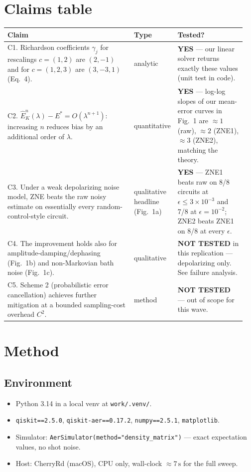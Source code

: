 \documentclass[11pt]{article}
\begin{document}
\section{Claims table}
\begin{longtable}{p{0.55\linewidth} p{0.10\linewidth} p{0.30\linewidth}}
\toprule
\textbf{Claim} & \textbf{Type} & \textbf{Tested?}\\
\midrule
C1. Richardson coefficients $\gamma_j$ for rescalings $c=(1,2)$ are $(2,-1)$ and for $c=(1,2,3)$ are $(3,-3,1)$ (Eq.~4). & analytic & \textbf{YES} --- our linear solver returns exactly these values (unit test in code).\\
C2. $\hat{E}^n_K(\lambda) - E^* = O(\lambda^{n+1})$: increasing $n$ reduces bias by an additional order of $\lambda$. & quantitative & \textbf{YES} --- log-log slopes of our mean-error curves in Fig.~1 are $\approx 1$ (raw), $\approx 2$ (ZNE1), $\approx 3$ (ZNE2), matching the theory.\\
C3. Under a weak depolarizing noise model, ZNE beats the raw noisy estimate on essentially every random-control-style circuit. & qualitative headline (Fig.~1a) & \textbf{YES} --- ZNE1 beats raw on 8/8 circuits at $\epsilon \le 3\!\times\!10^{-3}$ and 7/8 at $\epsilon = 10^{-2}$; ZNE2 beats ZNE1 on 8/8 at every $\epsilon$.\\
C4. The improvement holds also for amplitude-damping/dephasing (Fig.~1b) and non-Markovian bath noise (Fig.~1c). & qualitative & \textbf{NOT TESTED} in this replication --- depolarizing only. See failure analysis.\\
C5. Scheme 2 (probabilistic error cancellation) achieves further mitigation at a bounded sampling-cost overhead $C^2$. & method & \textbf{NOT TESTED} --- out of scope for this wave.\\
\bottomrule
\end{longtable}

\section{Method}
\subsection{Environment}
\begin{itemize}
  \item Python 3.14 in a local venv at \verb|work/.venv/|.
  \item \texttt{qiskit==2.5.0}, \texttt{qiskit-aer==0.17.2}, \texttt{numpy==2.5.1}, \texttt{matplotlib}.
  \item Simulator: \texttt{AerSimulator(method="density\_matrix")} --- exact expectation values,
    no shot noise.
  \item Host: CherryRd (macOS), CPU only, wall-clock $\approx 7\,\text{s}$ for the full sweep.
\end{itemize}
\end{document}
